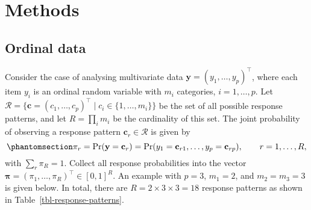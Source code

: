 \documentclass[
  letterpaper,
  DIV=11,
  numbers=noendperiod]{scrartcl}
\begin{document}
\section{Methods}\label{methods}

\subsection{Ordinal data}\label{ordinal-data}

Consider the case of analysing multivariate data
\(\mathbf y = (y_{1}, \ldots, y_{p})^\top\), where each item \(y_{i}\)
is an ordinal random variable with \(m_i\) categories, \(i=1,\dots,p\).
Let
\(\mathcal R = \{ \mathbf c = (c_1,\dots, c_p)^\top \mid c_i \in \{1,\dots, m_i\}\}\)
be the set of all possible response patterns, and let
\(R=\prod_{i} m_i\) be the cardinality of this set. The joint
probability of observing a response pattern
\(\mathbf c_r \in \mathcal R\) is given by
\begin{equation}\phantomsection\label{eq-each-joint-resp-prob}{
\pi_r = \Pr(\mathbf y = \mathbf c_r) = \Pr(y_1 = \mathbf c_{r1}, \ldots, y_p = \mathbf c_{rp}), \hspace{2em} r = 1, \ldots, R,
}\end{equation} with \(\sum_r \pi_R = 1\). Collect all response
probabilities into the vector
\(\boldsymbol \pi = (\pi_1, \ldots, \pi_R)^\top \in [0,1]^R\). An
example with \(p=3\), \(m_1=2\), and \(m_2=m_3=3\) is given below. In
total, there are \(R=2 \times 3 \times 3 = 18\) response patterns as
shown in Table~\ref{tbl-response-patterns}.
\end{document}
